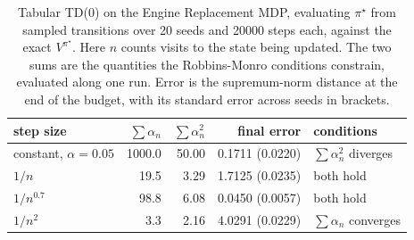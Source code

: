 \begin{table}[h]
\centering
\caption{Tabular TD($0$) on the Engine Replacement MDP, evaluating $\pi^\star$ from sampled transitions over 20 seeds and 20000 steps each, against the exact $V^{\pi^\star}$. Here $n$ counts visits to the state being updated. The two sums are the quantities the Robbins-Monro conditions constrain, evaluated along one run. Error is the supremum-norm distance at the end of the budget, with its standard error across seeds in brackets.}
\label{tab:prelim_td_schedules}
\begin{tabular}{lrrrl}
\hline
step size & $\sum \alpha_n$ & $\sum \alpha_n^2$ & final error & conditions \\
\hline
constant, $\alpha = 0.05$ & 1000.0 & 50.00 & 0.1711 (0.0220) & $\sum \alpha_n^2$ diverges \\
$1/n$ & 19.5 & 3.29 & 1.7125 (0.0235) & both hold \\
$1/n^{0.7}$ & 98.8 & 6.08 & 0.0450 (0.0057) & both hold \\
$1/n^2$ & 3.3 & 2.16 & 4.0291 (0.0229) & $\sum \alpha_n$ converges \\
\hline
\end{tabular}
\end{table}
